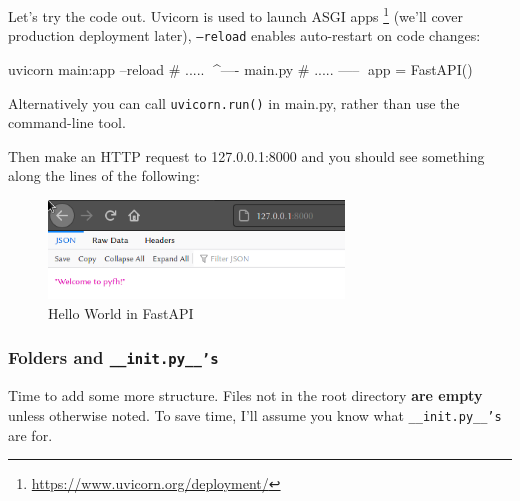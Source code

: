 \documentclass{article}
\newcommand{\flink}[1]{\footnote{\href{#1}{#1}}}
\begin{document}
Let's try the code out. Uvicorn is used to launch ASGI apps \flink{https://www.uvicorn.org/deployment/} (we'll cover production deployment later), \texttt{--reload} enables auto-restart on code changes:

\begin{bashcode}
uvicorn main:app --reload
# ..... ^^^^---- main.py
# ..... -----^^^ app = FastAPI()
\end{bashcode}

Alternatively you can call \texttt{uvicorn.run()} in main.py, rather than use the command-line tool.

Then make an HTTP request to 127.0.0.1:8000 and you should see something along the lines of the following:

\begin{figure}[h]
    \centering
    \includegraphics[width=0.7\textwidth]{img/helloworld.png}
    \caption{Hello World in FastAPI}
\end{figure}

\subsubsection{Folders and \texttt{\_\_init.py\_\_'s}}

Time to add some more structure. Files not in the root directory \textbf{are empty} unless otherwise noted. To save time, I'll assume you know what \texttt{\_\_init.py\_\_'s} are for.
\end{document}
